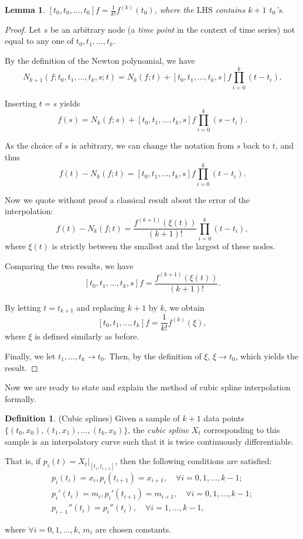\documentclass[a4paper,11pt,titlepage]{article}
\theoremstyle{definition}
\newtheorem{definition}{Definition}[section]
\theoremstyle{plain}
\newtheorem{lemma}[theorem]{Lemma}
\theoremstyle{remark}
\begin{document}
\begin{lemma}\label{lemma53}
    $[t_0,t_0,\dots,t_0]f=\frac{1}{k!}f^{(k)}(t_0)$, where the $\mathrm{LHS}$ contains $k+1$ $t_0$'s.
\end{lemma}
\begin{proof}
    \cite{Gautschi2012} Let $s$ be an arbitrary node (a \textit{time point} in the context of time series) not equal to any one of $t_0,t_1,\dots,t_k$.
    
    By the definition of the Newton polynomial, we have
    $$N_{k+1}(f;t_0,t_1,\dots,t_k,s;t)=N_k(f;t)+[t_0,t_1,\dots,t_k,s]f\prod_{i=0}^k(t-t_i).$$
    
    Inserting $t=s$ yields
    $$f(s)=N_k(f;s)+[t_0,t_1,\dots,t_k,s]f\prod_{i=0}^k(s-t_i).$$

    As the choice of $s$ is arbitrary, we can change the notation from $s$ back to $t$, and thus
    $$f(t)-N_k(f;t)=[t_0,t_1,\dots,t_k,s]f\prod_{i=0}^k(t-t_i).$$

    Now we quote without proof a classical result about the error of the interpolation:
    $$f(t)-N_k(f;t)=\frac{f^{(k+1)}(\xi(t))}{(k+1)!}\prod_{i=0}^k(t-t_i),$$
    where $\xi(t)$ is strictly between the smallest and the largest of these nodes.

    Comparing the two results, we have
    $$[t_0,t_1,\dots,t_k,s]f=\frac{f^{(k+1)}(\xi(t))}{(k+1)!}.$$
    
    By letting $t=t_{k+1}$ and replacing $k+1$ by $k$, we obtain
    $$[t_0,t_1,\dots,t_k]f=\frac{1}{k!}f^{(k)}(\xi),$$
    where $\xi$ is defined similarly as before.

    Finally, we let $t_1,\dots,t_k\rightarrow t_0$. Then, by the definition of $\xi$, $\xi\rightarrow t_0$, which yields the result.
\end{proof}

Now we are ready to state and explain the method of cubic spline interpolation formally.

\begin{definition}
    (Cubic splines) Given a sample of $k+1$ data points
$\{(t_0,x_0), (t_1,x_1), \dots, (t_k,x_k)\}$, the \textit{cubic spline} $X_t$ corresponding to this sample is an interpolatory curve such that it is twice continuously differentiable.

That is, if $p_i(t)=X_t|_{[t_i,t_{i+1}]}$, then the following conditions are satisfied:
\begin{align}
p_i(t_i)=x_i, p_i(t_{i+1})=x_{i+1},\quad\forall i=0,1,\dots,k-1; \tag{A}\label{eqA}\\
p_i'(t_i)=m_i, p_i'(t_{i+1})=m_{i+1},\quad\forall i=0,1,\dots,k-1; \tag{B}\label{eqB}\\
p_{i-1}''(t_i)=p_i''(t_i),\quad\forall i=1,\dots,k-1, \tag{C}\label{eqC}
\end{align}

where $\forall i=0,1,\dots,k$, $m_i$ are chosen constants.
\end{definition}
\end{document}

